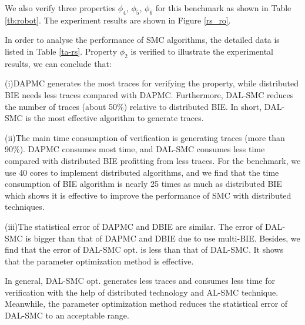 We also verify three properties $\phi_4$, $\phi_5$, $\phi_6$ for this benchmark as shown in Table \ref{tb:robot}. The experiment results are shown in Figure \ref{rs_ro}. 

In order to analyse the performance of SMC algorithms, the detailed data is listed in Table \ref{ta-rs}. Property $\phi_2$ is verified to illustrate the experimental results, we can conclude that: 

(i)DAPMC generates the most traces for verifying the property, while distributed BIE needs less traces compared with DAPMC. Furthermore, DAL-SMC reduces the number of traces (about 50\%) relative to distributed BIE.  In short, DAL-SMC is the most effective algorithm to generate traces.

(ii)The main time consumption of verification is generating traces (more than 90\%). DAPMC consumes most time, and DAL-SMC consumes less time compared with distributed BIE profitting from less traces. For the benchmark, we use 40 cores to implement distributed algorithms, and we find that the time consumption of BIE algorithm is nearly 25 times as much as distributed BIE which shows it is effective to improve the performance of SMC with distributed techniques. 

(iii)The statistical error of DAPMC and DBIE are similar. The error of DAL-SMC is bigger than that of DAPMC and DBIE due to use multi-BIE. Besides, we find that the error of DAL-SMC opt. is less than that of DAL-SMC. It shows that the parameter optimization method is effective. 

In general, DAL-SMC opt. generates less traces and consumes less time for verification with the help of distributed technology and AL-SMC technique. Meanwhile, the parameter optimization method reduces the statistical error of DAL-SMC to an acceptable range.

